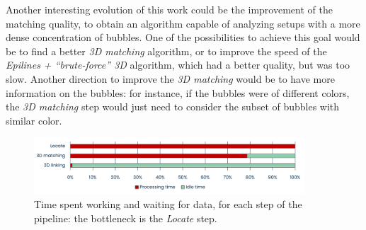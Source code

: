 

Another interesting evolution of this work could be the improvement of the matching quality, to obtain an algorithm capable of analyzing setups with a more dense concentration of bubbles.
One of the possibilities to achieve this goal would be to find a better \textit{3D matching} algorithm, or to improve the speed of the \textit{Epilines + ``brute-force'' 3D} algorithm, which had a better quality, but was too slow.
Another direction to improve the \textit{3D matching} would be to have more information on the bubbles: for instance, if the bubbles were of different colors, the \textit{3D matching} step would just need to consider the subset of bubbles with similar color.

\begin{figure}
	\centerline{\includegraphics[width=0.9\textwidth]{images/pipeline-usage-graph.png}}
	\caption{\centering Time spent working and waiting for data, for each step of the pipeline: the bottleneck is the \textit{Locate} step.}
	\label{fig:intro:pipeline-usage}
\end{figure}
